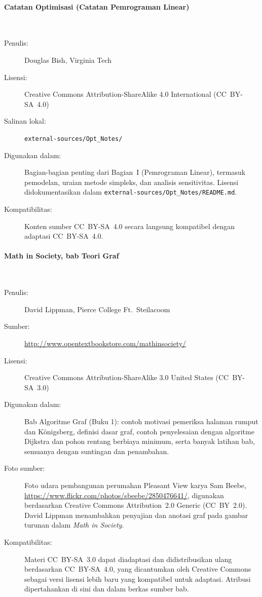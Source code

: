 \paragraph{Catatan Optimisasi (Catatan Pemrograman Linear)}\hspace{0pt}\\[-0.6em]
\begin{description}
  \item[Penulis:] Douglas Bish, Virginia Tech
  \item[Lisensi:] Creative Commons Attribution-ShareAlike 4.0
    International (CC~BY-SA~4.0)
  \item[Salinan lokal:] \texttt{external-sources/Opt\_Notes/}
  \item[Digunakan dalam:] Bagian-bagian penting dari Bagian~I (Pemrograman
    Linear), termasuk pemodelan, uraian metode simpleks, dan analisis
    sensitivitas. Lisensi didokumentasikan dalam
    \texttt{external-sources/Opt\_Notes/README.md}.
  \item[Kompatibilitas:] Konten sumber CC~BY-SA~4.0 secara langsung
    kompatibel dengan adaptasi CC~BY-SA~4.0.
\end{description}

\paragraph{Math in Society, bab Teori Graf}\hspace{0pt}\\[-0.6em]
\begin{description}
  \item[Penulis:] David Lippman, Pierce College Ft.\ Steilacoom
  \item[Sumber:] \url{http://www.opentextbookstore.com/mathinsociety/}
  \item[Lisensi:] Creative Commons Attribution-ShareAlike 3.0 United
    States (CC~BY-SA~3.0)
  \item[Digunakan dalam:] Bab Algoritme Graf (Buku 1): contoh motivasi
    pemeriksa halaman rumput dan K\"onigsberg, definisi dasar graf, contoh
    penyelesaian dengan algoritme Dijkstra dan pohon rentang berbiaya minimum, serta banyak
    latihan bab, semuanya dengan suntingan dan penambahan.
  \item[Foto sumber:] Foto udara pembangunan perumahan Pleasant View karya
    Sam Beebe, \url{https://www.flickr.com/photos/sbeebe/2850476641/},
    digunakan berdasarkan Creative Commons Attribution~2.0 Generic
    (CC~BY~2.0). David Lippman menambahkan penyajian dan anotasi graf pada
    gambar turunan dalam \emph{Math in Society}.
  \item[Kompatibilitas:] Materi CC~BY-SA~3.0 dapat diadaptasi dan
    didistribusikan ulang berdasarkan CC~BY-SA~4.0, yang dicantumkan oleh
    Creative Commons sebagai versi lisensi lebih baru yang kompatibel untuk
    adaptasi. Atribusi dipertahankan di sini dan dalam berkas sumber bab.
\end{description}

